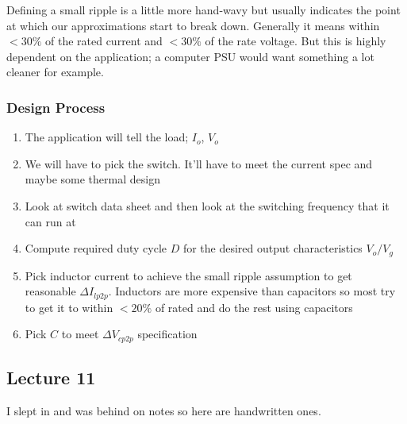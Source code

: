 \documentclass[../notes.tex]{subfiles}
\begin{document}


Defining a small ripple is a little more hand-wavy but usually indicates the point at which our approximations start to break down. Generally it means within $ < 30\% $ of the rated current and $ < 30\% $ of the rate voltage. 
But this is highly dependent on the application; a computer PSU would want something a lot cleaner for example.


\subsubsection{Design Process}

\begin{enumerate}
	\item The application will tell the load; $ I_o $, $ V_o $ 
	\item We will have to pick the switch. It'll have to meet the current spec and maybe some thermal design
	\item Look at switch data sheet and then look at the switching frequency that it can run at
	\item Compute required duty cycle $ D $ for the desired output characteristics $ V_o/V_g $ 
	\item Pick inductor current to achieve the small ripple assumption to get reasonable $ \Delta I_{lp2p}  $. Inductors are more expensive than capacitors so most try to get it to within $ <20\% $ of rated and do the rest using capacitors
	\item Pick $ C $ to meet $ \Delta V_{cp2p}  $  specification
\end{enumerate}



\subsection{Lecture 11}
I slept in and was behind on notes so here are handwritten ones.
\end{document}
